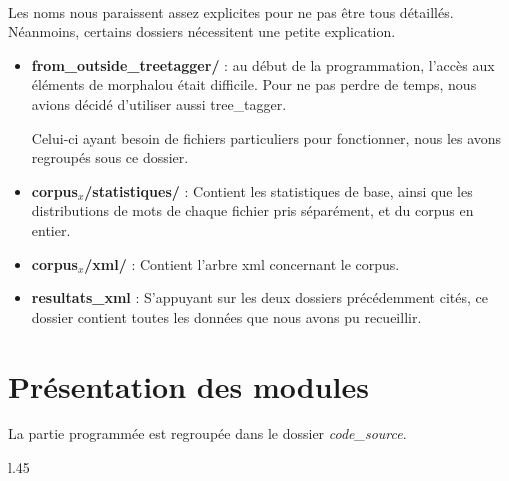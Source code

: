 ~\\

Les noms nous paraissent assez explicites pour ne pas être tous détaillés. Néanmoins, certains dossiers nécessitent  une petite explication.

	\begin{itemize}
	\item \textbf{from\_outside\_treetagger/} : au début de la programmation, l'accès aux éléments de morphalou était difficile. Pour ne pas perdre de temps, nous avions décidé d'utiliser aussi tree\_tagger.
	
	Celui-ci ayant besoin de fichiers particuliers pour fonctionner, nous les avons regroupés sous ce dossier.
	
	\item \textbf{corpus$_x$/statistiques/} : Contient les statistiques de base, ainsi que les distributions de mots de chaque fichier pris séparément, et du corpus en entier.
	
	\item \textbf{corpus$_x$/xml/} : Contient l'arbre xml concernant le corpus.
	
	\item \textbf{resultats\_xml} : S'appuyant sur les deux dossiers précédemment cités, ce dossier contient toutes les données que nous avons pu recueillir.
	\end{itemize}

\newpage
\section{Présentation des modules}

La partie programmée est regroupée dans le dossier \emph{code\_source}. \\

 \begin{wrapfigure}{l}{.45\textwidth} %
\end{wrapfigure}

